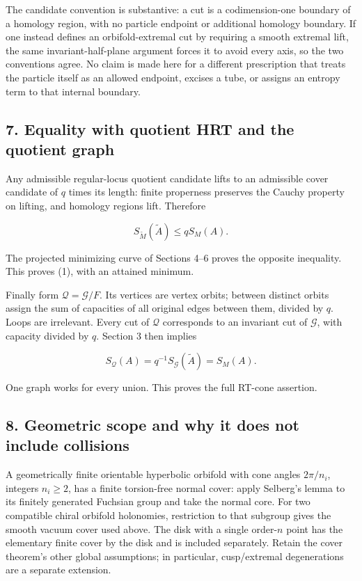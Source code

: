 \documentclass[11pt]{article}
\begin{document}
The candidate convention is substantive: a cut is a codimension-one
boundary of a homology region, with no particle endpoint or additional
homology boundary. If one instead defines an orbifold-extremal cut by
requiring a smooth extremal lift, the same invariant-half-plane argument
forces it to avoid every axis, so the two conventions agree. No claim is
made here for a different prescription that treats the particle itself
as an allowed endpoint, excises a tube, or assigns an entropy term to
that internal boundary.

\subsection{7. Equality with quotient HRT and the quotient
graph}\label{equality-with-quotient-hrt-and-the-quotient-graph}

Any admissible regular-locus quotient candidate lifts to an admissible
cover candidate of \(q\) times its length: finite properness preserves
the Cauchy property on lifting, and homology regions lift. Therefore

\[
 S_{\widetilde M}(\widetilde A)\le qS_M(A).
\]

The projected minimizing curve of Sections 4--6 proves the opposite
inequality. This proves (1), with an attained minimum.

Finally form \(\mathcal Q=\mathcal G/F\). Its vertices are vertex
orbits; between distinct orbits assign the sum of capacities of all
original edges between them, divided by \(q\). Loops are irrelevant.
Every cut of \(\mathcal Q\) corresponds to an invariant cut of
\(\mathcal G\), with capacity divided by \(q\). Section 3 then implies

\[
 S_{\mathcal Q}(A)=q^{-1}S_{\mathcal G}(\widetilde A)=S_M(A).
\]

One graph works for every union. This proves the full RT-cone assertion.

\subsection{8. Geometric scope and why it does not include
collisions}\label{geometric-scope-and-why-it-does-not-include-collisions}

A geometrically finite orientable hyperbolic orbifold with cone angles
\(2\pi/n_i\), integers \(n_i\ge2\), has a finite torsion-free normal
cover: apply Selberg's lemma to its finitely generated Fuchsian group
and take the normal core. For two compatible chiral orbifold holonomies,
restriction to that subgroup gives the smooth vacuum cover used above.
The disk with a single order-\(n\) point has the elementary finite cover
by the disk and is included separately. Retain the cover theorem's other
global assumptions; in particular, cusp/extremal degenerations are a
separate extension.
\end{document}

